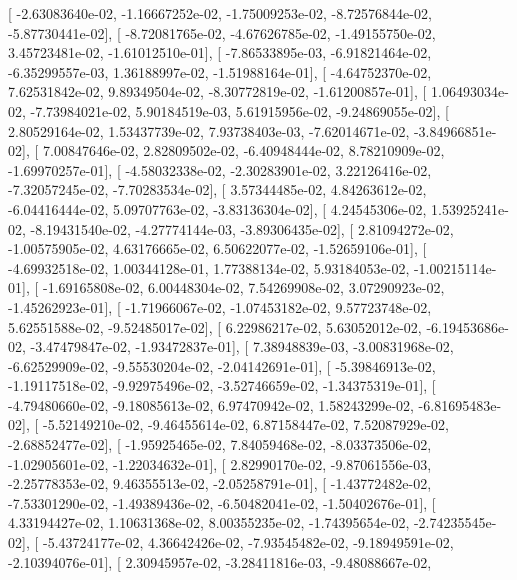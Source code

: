 \documentclass{article}
\begin{document}
       [ -2.63083640e-02,  -1.16667252e-02,  -1.75009253e-02,
         -8.72576844e-02,  -5.87730441e-02],
       [ -8.72081765e-02,  -4.67626785e-02,  -1.49155750e-02,
          3.45723481e-02,  -1.61012510e-01],
       [ -7.86533895e-03,  -6.91821464e-02,  -6.35299557e-03,
          1.36188997e-02,  -1.51988164e-01],
       [ -4.64752370e-02,   7.62531842e-02,   9.89349504e-02,
         -8.30772819e-02,  -1.61200857e-01],
       [  1.06493034e-02,  -7.73984021e-02,   5.90184519e-03,
          5.61915956e-02,  -9.24869055e-02],
       [  2.80529164e-02,   1.53437739e-02,   7.93738403e-03,
         -7.62014671e-02,  -3.84966851e-02],
       [  7.00847646e-02,   2.82809502e-02,  -6.40948444e-02,
          8.78210909e-02,  -1.69970257e-01],
       [ -4.58032338e-02,  -2.30283901e-02,   3.22126416e-02,
         -7.32057245e-02,  -7.70283534e-02],
       [  3.57344485e-02,   4.84263612e-02,  -6.04416444e-02,
          5.09707763e-02,  -3.83136304e-02],
       [  4.24545306e-02,   1.53925241e-02,  -8.19431540e-02,
         -4.27774144e-03,  -3.89306435e-02],
       [  2.81094272e-02,  -1.00575905e-02,   4.63176665e-02,
          6.50622077e-02,  -1.52659106e-01],
       [ -4.69932518e-02,   1.00344128e-01,   1.77388134e-02,
          5.93184053e-02,  -1.00215114e-01],
       [ -1.69165808e-02,   6.00448304e-02,   7.54269908e-02,
          3.07290923e-02,  -1.45262923e-01],
       [ -1.71966067e-02,  -1.07453182e-02,   9.57723748e-02,
          5.62551588e-02,  -9.52485017e-02],
       [  6.22986217e-02,   5.63052012e-02,  -6.19453686e-02,
         -3.47479847e-02,  -1.93472837e-01],
       [  7.38948839e-03,  -3.00831968e-02,  -6.62529909e-02,
         -9.55530204e-02,  -2.04142691e-01],
       [ -5.39846913e-02,  -1.19117518e-02,  -9.92975496e-02,
         -3.52746659e-02,  -1.34375319e-01],
       [ -4.79480660e-02,  -9.18085613e-02,   6.97470942e-02,
          1.58243299e-02,  -6.81695483e-02],
       [ -5.52149210e-02,  -9.46455614e-02,   6.87158447e-02,
          7.52087929e-02,  -2.68852477e-02],
       [ -1.95925465e-02,   7.84059468e-02,  -8.03373506e-02,
         -1.02905601e-02,  -1.22034632e-01],
       [  2.82990170e-02,  -9.87061556e-03,  -2.25778353e-02,
          9.46355513e-02,  -2.05258791e-01],
       [ -1.43772482e-02,  -7.53301290e-02,  -1.49389436e-02,
         -6.50482041e-02,  -1.50402676e-01],
       [  4.33194427e-02,   1.10631368e-02,   8.00355235e-02,
         -1.74395654e-02,  -2.74235545e-02],
       [ -5.43724177e-02,   4.36642426e-02,  -7.93545482e-02,
         -9.18949591e-02,  -2.10394076e-01],
       [  2.30945957e-02,  -3.28411816e-03,  -9.48088667e-02,
\end{document}
